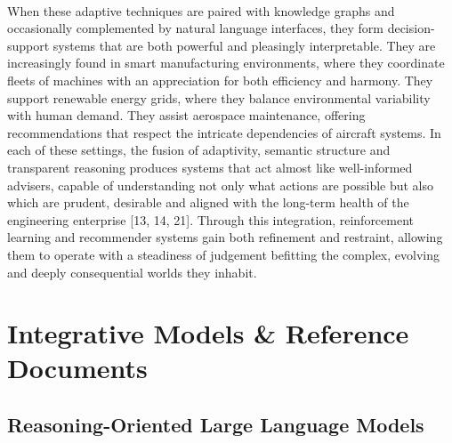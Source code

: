         \newpage
        \paragraph{}
        When these adaptive techniques are paired with knowledge graphs and occasionally complemented by natural language interfaces, they form decision-support systems that are both powerful and pleasingly interpretable. They are increasingly found in smart manufacturing environments, where they coordinate fleets of machines with an appreciation for both efficiency and harmony. They support renewable energy grids, where they balance environmental variability with human demand. They assist aerospace maintenance, offering recommendations that respect the intricate dependencies of aircraft systems. In each of these settings, the fusion of adaptivity, semantic structure and transparent reasoning produces systems that act almost like well-informed advisers, capable of understanding not only what actions are possible but also which are prudent, desirable and aligned with the long-term health of the engineering enterprise [13, 14, 21]. Through this integration, reinforcement learning and recommender systems gain both refinement and restraint, allowing them to operate with a steadiness of judgement befitting the complex, evolving and deeply consequential worlds they inhabit.
        
\section{Integrative Models \& Reference Documents}

    \subsection{Reasoning-Oriented Large Language Models}
